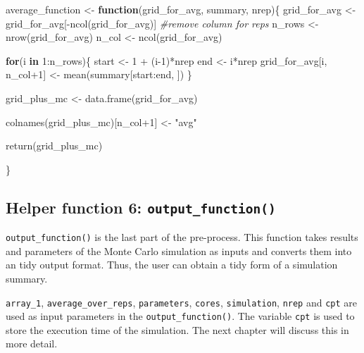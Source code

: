 \documentclass[11pt,a4paper]{article}
\newenvironment{Shaded}{\begin{snugshade}}{\end{snugshade}}
\newcommand{\CommentTok}[1]{\textcolor[rgb]{0.56,0.35,0.01}{\textit{#1}}}
\newcommand{\ControlFlowTok}[1]{\textcolor[rgb]{0.13,0.29,0.53}{\textbf{#1}}}
\newcommand{\DecValTok}[1]{\textcolor[rgb]{0.00,0.00,0.81}{#1}}
\newcommand{\FunctionTok}[1]{\textcolor[rgb]{0.00,0.00,0.00}{#1}}
\newcommand{\NormalTok}[1]{#1}
\newcommand{\OtherTok}[1]{\textcolor[rgb]{0.56,0.35,0.01}{#1}}
\newcommand{\SpecialCharTok}[1]{\textcolor[rgb]{0.00,0.00,0.00}{#1}}
\newcommand{\StringTok}[1]{\textcolor[rgb]{0.31,0.60,0.02}{#1}}
\begin{document}
\begin{Shaded}
\begin{Highlighting}[]
\NormalTok{average\_function }\OtherTok{\textless{}{-}} \ControlFlowTok{function}\NormalTok{(grid\_for\_avg, summary, nrep)\{}
\NormalTok{  grid\_for\_avg }\OtherTok{\textless{}{-}}\NormalTok{ grid\_for\_avg[}\SpecialCharTok{{-}}\FunctionTok{ncol}\NormalTok{(grid\_for\_avg)] }\CommentTok{\#remove column for reps}
\NormalTok{  n\_rows }\OtherTok{\textless{}{-}} \FunctionTok{nrow}\NormalTok{(grid\_for\_avg)}
\NormalTok{  n\_col }\OtherTok{\textless{}{-}} \FunctionTok{ncol}\NormalTok{(grid\_for\_avg)}
  
  \ControlFlowTok{for}\NormalTok{(i }\ControlFlowTok{in} \DecValTok{1}\SpecialCharTok{:}\NormalTok{n\_rows)\{}
\NormalTok{    start }\OtherTok{\textless{}{-}} \DecValTok{1} \SpecialCharTok{+}\NormalTok{ (i}\DecValTok{{-}1}\NormalTok{)}\SpecialCharTok{*}\NormalTok{nrep}
\NormalTok{    end }\OtherTok{\textless{}{-}}\NormalTok{ i}\SpecialCharTok{*}\NormalTok{nrep}
\NormalTok{    grid\_for\_avg[i, n\_col}\SpecialCharTok{+}\DecValTok{1}\NormalTok{] }\OtherTok{\textless{}{-}} \FunctionTok{mean}\NormalTok{(summary[start}\SpecialCharTok{:}\NormalTok{end, ])}
\NormalTok{  \}}
  
\NormalTok{  grid\_plus\_mc }\OtherTok{\textless{}{-}} \FunctionTok{data.frame}\NormalTok{(grid\_for\_avg)}
  
  \FunctionTok{colnames}\NormalTok{(grid\_plus\_mc)[n\_col}\SpecialCharTok{+}\DecValTok{1}\NormalTok{] }\OtherTok{\textless{}{-}} \StringTok{"avg"}
  
  \FunctionTok{return}\NormalTok{(grid\_plus\_mc)}
  
\NormalTok{\}}
\end{Highlighting}
\end{Shaded}

\hypertarget{helper-function-6-output_function}{%
\subsection{\texorpdfstring{Helper function 6:
\texttt{output\_function()}}{Helper function 6: output\_function()}}\label{helper-function-6-output_function}}

\texttt{output\_function()} is the last part of the pre-process. This
function takes results and parameters of the Monte Carlo simulation as
inputs and converts them into an tidy output format. Thus, the user can
obtain a tidy form of a simulation summary.

\texttt{array\_1}, \texttt{average\_over\_reps}, \texttt{parameters},
\texttt{cores}, \texttt{simulation}, \texttt{nrep} and \texttt{cpt} are
used as input parameters in the \texttt{output\_function()}. The
variable \texttt{cpt} is used to store the execution time of the
simulation. The next chapter will discuss this in more detail.
\end{document}
